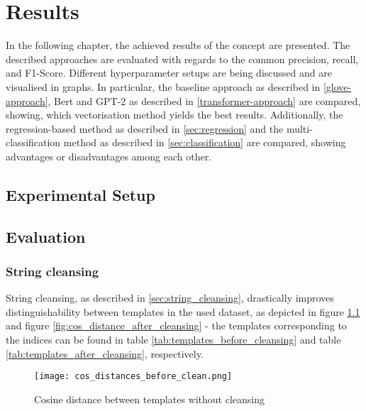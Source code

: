 \chapter{Results\label{cha:results}}

In the following chapter, the achieved results of the concept are presented. The described approaches are evaluated with regards to the common precision, recall, and F1-Score. Different hyperparameter setups are being discussed and are visualised in graphs. In particular, the baseline approach as described in \ref{glove-approach}, Bert and GPT-2 as described in \ref{transformer-approach} are compared, showing, which vectorisation method yields the best results. Additionally, the regression-based method as described in \ref{sec:regression} and the multi-classification method as described in \ref{sec:classification} are compared, showing advantages or disadvantages among each other.





\section{Experimental Setup}







\section{Evaluation}
\subsection{String cleansing}
String cleansing, as described in \ref{sec:string_cleansing}, drastically improves distinguishability between templates in the used dataset, as depicted in figure \ref{fig:cos_distance_before_cleansing} and figure \ref{fig:cos_distance_after_cleansing} - the templates corresponding to the indices can be found in table \ref{tab:templates_before_cleansing} and table \ref{tab:templates_after_cleansing}, respectively.



\begin{figure}[h]
  \centering
  \texttt{[image: cos\_distances\_before\_clean.png]}\\
  \caption{Cosine distance between templates without cleansing}
  \label{fig:cos_distance_before_cleansing}
\end{figure}


